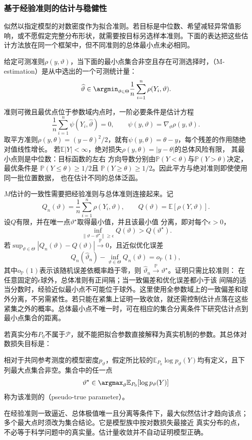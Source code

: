 \subsubsection{基于经验准则的估计与稳健性}
似然以指定模型的对数密度作为拟合准则。若目标是中位数、希望减轻异常值影响，或不愿假定完整分布形状，就需要按目标另选样本准则。下面的表达把这些估计方法放在同一个框架中，但不同准则的总体最小点未必相同。
\begin{definition}[M估计]
  \label{def:statistics-m-estimator}
给定可测准则\(\rho(y,\vartheta)\)，当下面的最小点集合非空且存在可测选择时，（M-estimation）是从中选出的一个可测统计量：
\[
  \widehat\vartheta
  \in\argmin_{\vartheta\in\Theta}
  \frac1n\sum_{i=1}^n\rho(Y_i,\vartheta).
\]
\end{definition}
准则可微且最优点位于参数域内点时，一阶必要条件是估计方程
\[
  \frac1n\sum_{i=1}^n\psi(Y_i,\widehat\vartheta)=0,
  \qquad
  \psi(y,\vartheta)=\nabla_\vartheta\rho(y,\vartheta).
\]
取平方准则\(\rho(y,\theta)=(y-\theta)^2/2\)，就有\(\psi(y,\theta)=\theta-y\)，每个残差的作用随绝对值线性增长。
若\(\mathbb E|Y|<\infty\)，绝对损失\(\rho(y,\theta)=|y-\theta|\)的总体风险有限，
其最小点则是中位数：目标函数的左右
方向导数分别由\(\mathbb{P}(Y<\theta)\)与\(\mathbb{P}(Y>\theta)\)决定，最优条件是
\(\mathbb{P}(Y\leq\theta)\geq1/2\)且
\(\mathbb{P}(Y\geq\theta)\geq1/2\)。因此平方与绝对准则即使使用同一批位置数据，
也在估计不同的总体泛函。

\(M\)估计的一致性需要把经验准则与总体准则连接起来。记
\[
  Q_n(\vartheta)=\frac1n\sum_{i=1}^n\rho(Y_i,\vartheta),
  \qquad
  Q(\vartheta)=\mathbb{E}[\rho(Y,\vartheta)].
\]
设\(Q\)有限，并在唯一点\(\vartheta^\star\)取得最小值，并且该最小值
分离，即对每个\(\epsilon>0\)，
\[
  \inf_{\lVert\vartheta-\vartheta^\star\rVert\geq\epsilon}
  Q(\vartheta)>Q(\vartheta^\star).
\]
若\(\sup_{\vartheta\in\Theta}|Q_n(\vartheta)-Q(\vartheta)|
\xrightarrow{\mathbb{P}}0\)，且近似优化误差
\[
  Q_n(\widehat\vartheta_n)-\inf_{\vartheta\in\Theta}Q_n(\vartheta)
  =o_{\mathbb{P}}(1),
\]
其中\(o_{\mathbb{P}}(1)\)表示该随机误差依概率趋于零，则
\(\widehat\vartheta_n\xrightarrow{\mathbb{P}}\vartheta^\star\)。证明只需比较准则：
在任意固定的\(\epsilon\)球外，总体准则有正间隔；当一致偏差和优化误差都小于该
间隔的适当分数时，经验近似最小点不可能位于球外。这里使用全参数域上的一致偏差和球外分离，不另需紧性。若只能在紧集上证明一致收敛，就还需控制估计点落在这些紧集之外的概率。总体最小点不唯一时，可在相应的集合分离条件下研究估计点到最小点集合的距离。

若真实分布\(P_0\)不属于\(\mathcal P\)，就不能把拟合参数直接解释为真实机制的参数。其总体对数损失目标是：
\begin{definition}[伪真参数]
  \label{def:statistics-pseudo-true-parameter}
相对于共同参考测度的模型密度\(p_\vartheta\)，假定所比较的\(\mathbb E_{P_0}\log p_\vartheta(Y)\)均有定义，且下列最大点集合非空。集合中的任一点
\[
  \vartheta^\star
  \in\argmax_\vartheta\mathbb{E}_{P_0}[\log p_\vartheta(Y)]
\]
称为该准则的（pseudo-true parameter）。
\end{definition}
在经验准则一致逼近、总体极值唯一且分离等条件下，最大似然估计才趋向该点；多个最大点时须改为集合结论。它是模型族中按对数损失最接近
真实分布的点，不必等于科学问题中的真实量。估计量收敛并不自动证明模型正确。

